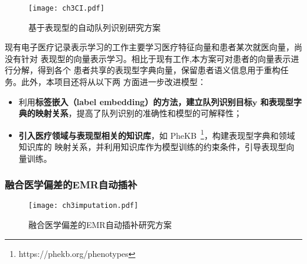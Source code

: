 \begin{figure}
    \begin{small}
        \begin{center}
            \texttt{[image: ch3CI.pdf]}
        \end{center}
        \caption{基于表现型的自动队列识别研究方案}
        \label{fig:ch3:ci}
    \end{small}
\end{figure}

现有电子医疗记录表示学习的工作主要学习医疗特征向量和患者某次就医向量，尚没有针对
表现型的向量表示学习。相比于现有工作,本方案可对患者的向量表示进行分解，得到各个
患者共享的表现型字典向量，保留患者语义信息用于重构任务。此外，本项目还将从以下两
方面进一步改进模型：
\begin{itemize}
    \item 利用\textbf{标签嵌入（label embedding）的方法，建立队列识别目标$\bm y$
    和表现型字典的映射关系}，提高了队列识别的准确性和模型的可解释性；
    \item \textbf{引入医疗领域与表现型相关的知识库}，如
    PheKB~\footnote{https://phekb.org/phenotypes}，构建表现型字典和领域知识库的
    映射关系，并利用知识库作为模型训练的约束条件，引导表现型向量训练。
\end{itemize}



\subsubsection{融合医学偏差的EMR自动插补}\label{ch3_2}

\begin{comment}
融合医学偏差的EMR自动插补旨在将在时间维度上不规则的电子医疗记录补全为完整的电子
医疗记录，可降低后续预测模型的复杂度和训练时间。电子医疗记录除了反映患者的身体健
康状态，还包含的患者与医院、医生与电子病历系统的交互过程，通常这些附加因素会引入
医学偏差。研究表明，医学偏差可用于对患者更精细的分类，对于理解电子医疗记录有重要
辅助作用，许多医学偏差都会通过医疗特征被记录的时间推断出来，这为建模引入医学偏差
提供了理论基础。本项目利用医疗特征记录的时间和电子医疗记录中缺失值出现的位置，学
习特征的缺失规律，进而将所学缺失规律融入插补模型中。
\end{comment}

\begin{figure}
    \begin{small}
        \begin{center}
            \texttt{[image: ch3imputation.pdf]}
        \end{center}
        \caption{融合医学偏差的EMR自动插补研究方案}
        \label{fig:ch3:imputation}
    \end{small}
\end{figure}

